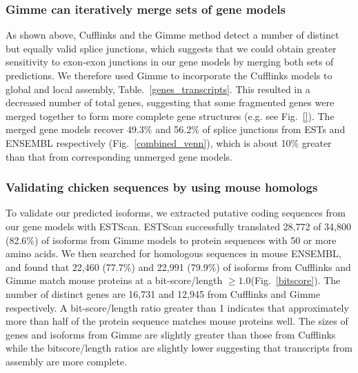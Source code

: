 \documentclass[10pt]{article}
\begin{document}
\subsubsection*{Gimme can iteratively merge sets of gene models}


As shown above, Cufflinks and the Gimme method detect a number of distinct but
equally valid splice junctions, which suggests that we could obtain greater
sensitivity to exon-exon junctions in our gene models by merging both sets of
predictions.  We therefore used Gimme to incorporate the Cufflinks models to
global and local assembly, Table.~\ref{genes_transcripts}.  This resulted in a
decreased number of total genes, suggesting that some fragmented genes were
merged together to form more complete gene structures (e.g. see
Fig.~\ref{}). The merged gene models recover 49.3\% and 56.2\% of
splice junctions from ESTs and ENSEMBL respectively
(Fig.~\ref{combined_venn}), which is about 10\% greater than that from
corresponding unmerged gene models.


\subsubsection*{Validating chicken sequences by using mouse homologs}

To validate our predicted isoforms, we extracted putative coding sequences from
our gene models with ESTScan\cite{Iseli:1999vd}.  ESTScan successfully
translated 28,772 of 34,800 (82.6\%) of isoforms from Gimme models to protein
sequences with 50 or more amino acids.  We then searched for homologous
sequences in mouse ENSEMBL, and found that 22,460 (77.7\%) and 22,991 (79.9\%)
of isoforms from Cufflinks and Gimme match mouse proteins at a bit-score/length
$\ge1.0$(Fig.~\ref{bitscore}).  The number of distinct genes are 16,731 and
12,945 from Cufflinks and Gimme respectively.  A bit-score/length ratio greater
than 1 indicates that approximately more than half of the protein sequence
matches mouse proteins well. The sizes of genes and isoforms from Gimme are
slightly greater than those from Cufflinks while the bitscore/length ratios are
slightly lower suggesting that transcripts from assembly are more complete.


\end{document}
